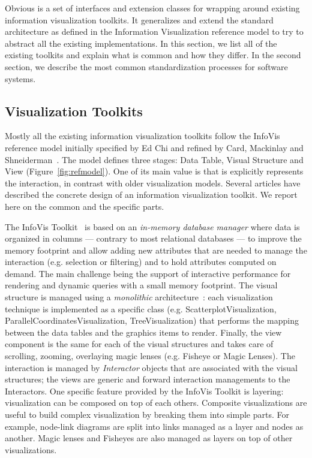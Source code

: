 Obvious is a set of interfaces and extension classes for wrapping
around existing information visualization toolkits.  It generalizes
and extend the standard architecture as defined in the Information
Visualization reference model to try to abstract all the existing
implementations.  In this section, we list all of the existing
toolkits and explain what is common and how they differ.  In the
second section, we describe the most common standardization processes
for software systems.

\subsection{Visualization Toolkits}

Mostly all the existing information visualization toolkits follow the
InfoVis reference model initially specified by Ed Chi and refined by
Card, Mackinlay and Shneiderman~\cite{ChiRefModel,ReadingsIV}.  The
model defines three stages: Data Table, Visual Structure and View
(Figure~\ref{fig:refmodel}).  One of its main value is that is
explicitly represents the interaction, in contrast with older
visualization models.
Several articles have described the concrete design of an information
visualization toolkit.  We report here on the common and the
specific parts.

The InfoVis Toolkit~\cite{InfoVis} is based on an \emph{in-memory
  database manager} where data is organized in columns --- contrary to
most relational databases --- to improve the memory footprint and
allow adding new attributes that are needed to manage the interaction
(e.g. selection or filtering) and to hold attributes computed on
demand.  The main challenge being the support of interactive
performance for rendering and dynamic queries with a small memory
footprint.  The visual structure is managed using a \emph{monolithic}
architecture~\cite{Polylithic}: each visualization technique is
implemented as a specific class (e.g. ScatterplotVisualization,
ParallelCoordinatesVisualization, TreeVisualization) that performs the
mapping between the data tables and the graphics items to render.
Finally, the view component is the same for each of the visual
structures and takes care of scrolling, zooming, overlaying magic
lenses (e.g. Fisheye or Magic Lenses).  The interaction is managed by
\emph{Interactor} objects that are associated with the visual
structures; the views are generic and forward interaction managements
to the Interactors.  One specific feature provided by the InfoVis
Toolkit is layering: visualization can be composed on top of each
others.  Composite visualizations are useful to build complex
visualization by breaking them into simple parts. For example,
node-link diagrams are split into links managed as a layer and nodes
as another.  Magic lenses and Fisheyes are also managed as layers on
top of other visualizations.

